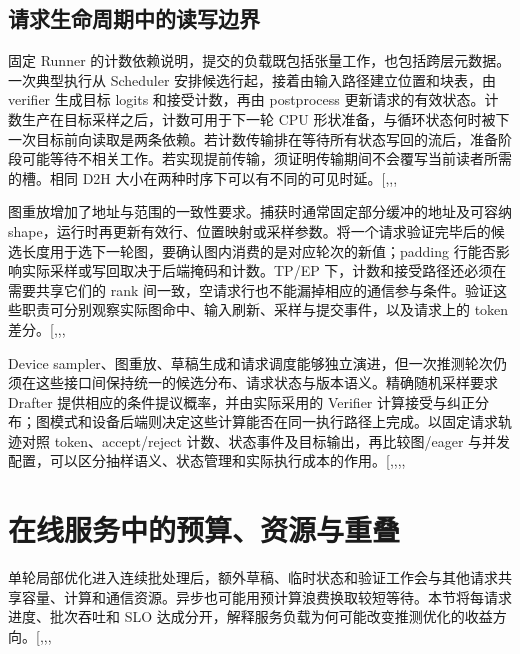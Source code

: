 \documentclass[
  a4paper,
  UTF8,
  fontset=none,
  zihao=5]{ctexart}
\begin{document}
\subsection{请求生命周期中的读写边界}\label{lifecycle}

固定 Runner
的计数依赖说明，提交的负载既包括张量工作，也包括跨层元数据。一次典型执行从
Scheduler 安排候选行起，接着由输入路径建立位置和块表，由 verifier
生成目标 logits 和接受计数，再由 postprocess
更新请求的有效状态。计数生产在目标采样之后，计数可用于下一轮 CPU
形状准备，与循环状态何时被下一次目标前向读取是两条依赖。若计数传输排在等待所有状态写回的流后，准备阶段可能等待不相关工作。若实现提前传输，须证明传输期间不会覆写当前读者所需的槽。相同
D2H
大小在两种时序下可以有不同的可见时延。{[},,,\citeproc{ref-vllm-scheduler}{65}{]}

图重放增加了地址与范围的一致性要求。捕获时通常固定部分缓冲的地址及可容纳
shape，运行时再更新有效行、位置映射或采样参数。将一个请求验证完毕后的候选长度用于选下一轮图，要确认图内消费的是对应轮次的新值；padding
行能否影响实际采样或写回取决于后端掩码和计数。TP/EP
下，计数和接受路径还必须在需要共享它们的 rank
间一致，空请求行也不能漏掉相应的通信参与条件。验证这些职责可分别观察实际图命中、输入刷新、采样与提交事件，以及请求上的
token
差分。{[},,,\citeproc{ref-pr-graph}{68}{]}

Device
sampler、图重放、草稿生成和请求调度能够独立演进，但一次推测轮次仍须在这些接口间保持统一的候选分布、请求状态与版本语义。精确随机采样要求
Drafter 提供相应的条件提议概率，并由实际采用的 Verifier
计算接受与纠正分布；图模式和设备后端则决定这些计算能否在同一执行路径上完成。以固定请求轨迹对照
token、accept/reject 计数、状态事件及目标输出，再比较图/eager
与并发配置，可以区分抽样语义、状态管理和实际执行成本的作用。{[},,,,\citeproc{ref-pr-sampling}{69}{]}

\section{在线服务中的预算、资源与重叠}\label{serving}

单轮局部优化进入连续批处理后，额外草稿、临时状态和验证工作会与其他请求共享容量、计算和通信资源。异步也可能用预计算浪费换取较短等待。本节将每请求进度、批次吞吐和
SLO
达成分开，解释服务负载为何可能改变推测优化的收益方向。{[},,,\citeproc{ref-pipespec}{70}{]}
\end{document}
